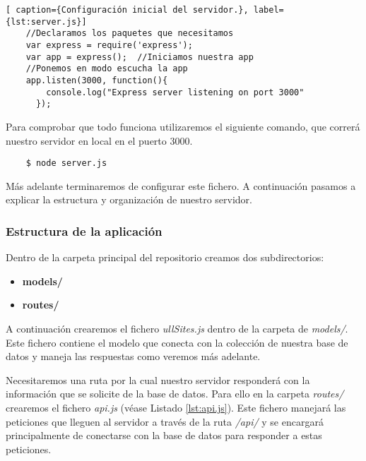 \begin{lstlisting}[ caption={Configuración inicial del servidor.}, label={lst:server.js}]
    //Declaramos los paquetes que necesitamos
    var express = require('express');  
    var app = express();  //Iniciamos nuestra app
    //Ponemos en modo escucha la app
    app.listen(3000, function(){
        console.log("Express server listening on port 3000"
      });

\end{lstlisting}

Para comprobar que todo funciona utilizaremos el siguiente comando, que correrá nuestro servidor en local en el puerto 3000.
\begin{lstlisting}
    $ node server.js
\end{lstlisting}

Más adelante terminaremos de configurar este fichero. A continuación pasamos a explicar la estructura y organización de nuestro servidor.

\subsubsection{Estructura de la aplicación}

Dentro de la carpeta principal del repositorio creamos dos subdirectorios:

\begin{itemize}
    \item \textbf{models/}
    \item \textbf{routes/}
\end{itemize}

A continuación crearemos el fichero \textit{ullSites.js} dentro de la carpeta de \textit{models/}. Este fichero contiene el modelo que conecta con la colección de nuestra base de datos y maneja las respuestas como veremos más adelante.   


Necesitaremos una ruta por la cual nuestro servidor responderá con la información que se solicite de la base de datos. Para ello en la carpeta \textit{routes/} crearemos el fichero \textit{api.js} (véase Listado \ref{lst:api.js}). Este fichero manejará las peticiones que lleguen al servidor a través de la ruta \textit{/api/} y se encargará principalmente de conectarse con la base de datos para responder a estas peticiones.

